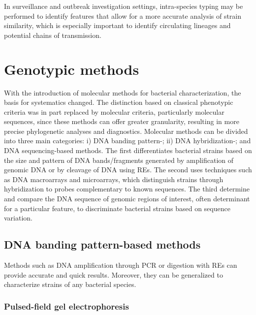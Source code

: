 In surveillance and outbreak investigation settings, intra-species typing may be performed to identify features that allow for a more accurate analysis of strain similarity, which is especially important to identify circulating lineages and potential chains of transmission.

\section{Genotypic methods}

With the introduction of molecular methods for bacterial characterization, the basis for systematics changed. The distinction based on classical phenotypic criteria was in part replaced by molecular criteria, particularly molecular sequences, since these methods can offer greater granularity, resulting in more precise phylogenetic analyses and diagnostics. Molecular methods can be divided into three main categories: i) \ac{DNA} banding pattern-; ii) \ac{DNA} hybridization-; and \ac{DNA} sequencing-based methods. The first differentiates bacterial strains based on the size and pattern of \ac{DNA} bands/fragments generated by amplification of genomic \ac{DNA} or by cleavage of \ac{DNA} using \ac{REs}. The second uses techniques such as \ac{DNA} macroarrays and microarrays, which distinguish strains through hybridization to probes complementary to known sequences. The third determine and compare the \ac{DNA} sequence of genomic regions of interest, often determinant for a particular feature, to discriminate bacterial strains based on sequence variation.

\subsection{DNA banding pattern-based methods}

Methods such as \ac{DNA} amplification through \ac{PCR} or digestion with \ac{REs} can provide accurate and quick results. Moreover, they can be generalized to characterize strains of any bacterial species.

\subsubsection{Pulsed-field gel electrophoresis}

